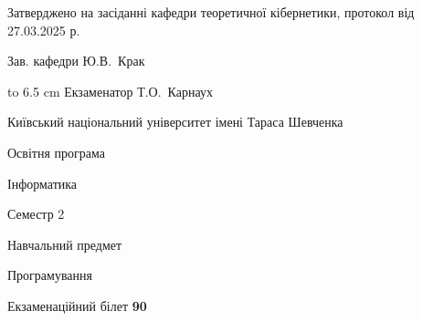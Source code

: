 \documentclass[12pt, ukrainian]{article}
\begin{document}
{\smallskip\smallskip \begin {scriptsize} Затверджено на засіданні кафедри теоретичної кібернетики, протокол   від   27.03.2025 р.\par\smallskip\smallskip\smallskip\smallskip
{\parbox {6.5 cm} {Зав. кафедри \dotfill Ю.В.~Крак}}\hspace {0.7cm} {\hbox to 6.5 cm { Екзаменатор \dotfill Т.О.~Карнаух}} \end{scriptsize}}
\newpage
{{\begin {scriptsize}\par
{ \center  Київський національний університет імені Тараса Шевченка \par}
{\parbox {5 cm}{Освітня програма \hfill}{\parbox {7 cm}{Інформатика\hfill}}\parbox {6 cm}{\hfill Семестр 2}}\par
{\parbox {5 cm} {Навчальний предмет \hfill}\parbox {7 cm}{Програмування \hfill}\parbox {6cm}{\hfill}\par}\vspace{-15pt} \end{scriptsize}}{\center Екзаменаційний білет \No \textbf { 90 }\par}}
\end{document}
